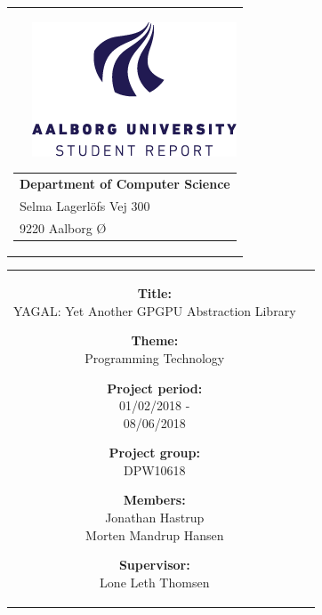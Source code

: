 \thispagestyle{empty}

{\samepage 
\begin{tabular}{r}
	\parbox{\textwidth}{ {\includegraphics[scale=0.5]{misc/aauLogoEn.png}}
	\hfill \parbox{7cm}{\begin{tabular}{l} %
		{\small \textbf{Department of Computer Science}}\\
		{\small Selma Lagerlöfs Vej 300} \\
		{\small 9220 Aalborg Ø}
	\end{tabular}}
	}
\end{tabular}

\begin{tabular}{cc}
	\parbox{7cm}{
	\begin{description}
		\item { \textbf{Title:}}\\ 
			YAGAL: Yet Another GPGPU Abstraction Library
    		\item { \textbf{Theme:}}\\ 
			Programming Technology\\
	\end{description}
	
	\parbox{7cm}{
	\begin{description}
		\item { \textbf{Project period:}}\\
			01/02/2018 -\\
			08/06/2018\\
 		\hspace{4cm}
		\item { \textbf{Project group:}}\\
  			DPW10618\\
 		\hspace{4cm}
		\item {\textbf{Members:}}\\
            Jonathan Hastrup\\
            Morten Mandrup Hansen\\
		\hspace{2cm}
		\item { \textbf{Supervisor:}}\\
 			Lone Leth Thomsen\\
  	\end{description}
	}

}
\end{tabular}}
